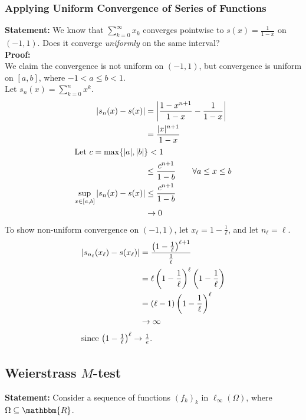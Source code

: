 \documentclass[10pt]{extarticle}
\newcommand{\R}{\mathbbm{R}}
\begin{document}
    \subsubsection{Applying Uniform Convergence of Series of Functions}%
    \textbf{Statement:} We know that $\sum_{k=0}^{\infty} x_k$ converges pointwise to $s(x) = \frac{1}{1-x}$ on $(-1,1)$. Does it converge \textit{uniformly} on the same interval?\\

    \textbf{Proof:}\\
    We claim the convergence is not uniform on $(-1,1)$, but convergence is uniform on $[a,b]$, where $-1 < a \leq b < 1 $.\\

    Let $s_n(x) = \sum_{k=0}^{n}x^k$.
    \begin{align*}
      |s_n(x) - s(x)| &= \left\vert\frac{1-x^{n+1}}{1-x} - \frac{1}{1-x}\right\vert\\
                      &= \frac{|x|^{n+1}}{1-x}\\
      \shortintertext{Let $c = \max\{|a|,|b|\} < 1$}
                      &\leq \frac{c^{n+1}}{1-b}\tag*{$\forall a \leq x \leq b$}\\
      \sup_{x\in[a,b]}|s_n(x) - s(x)| &\leq \frac{c^{n+1}}{1-b}\\
                                      &\rightarrow 0
    \end{align*}
    To show non-uniform convergence on $(-1,1)$, let $x_{\ell} = 1 - \frac{1}{\ell}$, and let $n_{\ell} = \ell$.
    \begin{align*}
      \left|s_{n_{\ell}}(x_{\ell}) - s(x_{\ell})\right| &= \frac{\left(1-\frac{1}{\ell}\right)^{\ell+1}}{\frac{1}{\ell}}\\
                                                        &= \ell\left(1-\frac{1}{\ell}\right)^{\ell}\left(1-\frac{1}{\ell}\right)\\
                                                        &= (\ell - 1)\left(1-\frac{1}{\ell}\right)^{\ell}\\
                                                        &\rightarrow \infty\\
      \shortintertext{since $\left(1-\frac{1}{\ell}\right)^{\ell}\rightarrow \frac{1}{e}$.}
    \end{align*}
  \subsection{Weierstrass $M$-test}%
    \textbf{Statement:} Consider a sequence of functions $(f_k)_k$ in $\ell_{\infty}(\Omega)$, where $\Omega \subseteq \R$.\\
\end{document}

